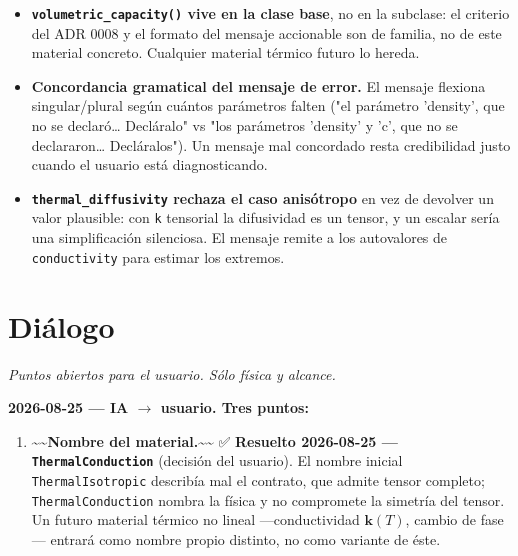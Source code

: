 \documentclass[11pt,letterpaper,oneside]{report}
\begin{document}
\begin{itemize}
  \item \textbf{\texttt{volumetric\_capacity()} vive en la clase base}, no en la subclase: el criterio del ADR 0008 y el formato del mensaje accionable son de familia, no de este material concreto. Cualquier material térmico futuro lo hereda.
\end{itemize}

\begin{itemize}
  \item \textbf{Concordancia gramatical del mensaje de error.} El mensaje flexiona singular/plural según cuántos parámetros falten ("el parámetro 'density', que no se declaró\ldots{} Decláralo" vs "los parámetros 'density' y 'c', que no se declararon\ldots{} Decláralos"). Un mensaje mal concordado resta credibilidad justo cuando el usuario está diagnosticando.
\end{itemize}

\begin{itemize}
  \item \textbf{\texttt{thermal\_diffusivity} rechaza el caso anisótropo} en vez de devolver un valor plausible: con \texttt{k} tensorial la difusividad es un tensor, y un escalar sería una simplificación silenciosa. El mensaje remite a los autovalores de \texttt{conductivity} para estimar los extremos.
\end{itemize}


\section{Diálogo}

\textit{Puntos abiertos para el usuario. Sólo física y alcance.}

\textbf{2026-08-25 --- IA \ensuremath{\to} usuario. Tres puntos:}

\begin{enumerate}
  \item \textasciitilde{}\textasciitilde{}\textbf{Nombre del material.}\textasciitilde{}\textasciitilde{} ✅ \textbf{Resuelto 2026-08-25 --- \texttt{ThermalConduction}} (decisión del usuario). El nombre inicial \texttt{ThermalIsotropic} describía mal el contrato, que admite tensor completo; \texttt{ThermalConduction} nombra la física y no compromete la simetría del tensor. Un futuro material térmico no lineal ---conductividad $\mathbf k(T)$, cambio de fase--- entrará como nombre propio distinto, no como variante de éste.
\end{enumerate}
\end{document}
